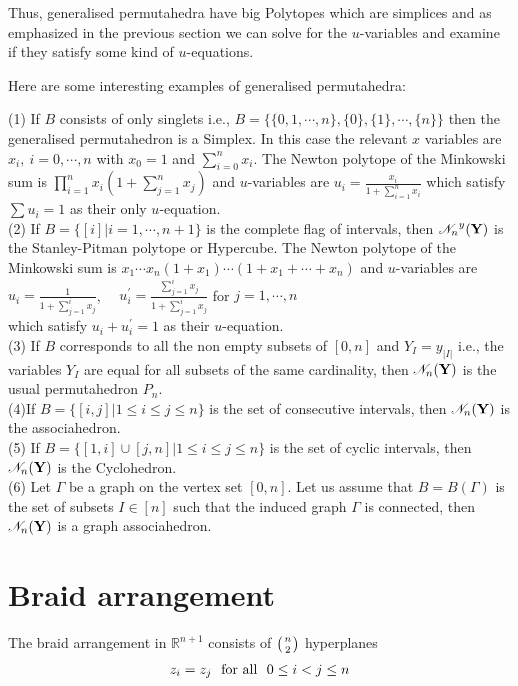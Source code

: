 \documentclass[hidelinks,12pt]{article}
\newcommand{\bea}[1]{\begin{eqnarray}\label{#1} }
\newcommand{\eea}{\end{eqnarray}}
\def\bea{\begin{eqnarray}}
\def\eea{\end{eqnarray}}
\begin{document}
Thus, generalised permutahedra have big Polytopes which are simplices and as emphasized in the previous section we can solve for the $u$-variables and examine if they satisfy some kind of $u$-equations.

Here are some interesting examples of generalised permutahedra:

(1) If $B$ consists of only singlets i.e., $B=\{ \{ 0,1,\cdots,n \}, \{ 0 \},\{ 1 \},\cdots ,\{ n \} \}$ then the generalised permutahedron is a Simplex. In this case the relevant $x$ variables are $x_i,~ i=0,\cdots,n$ with $x_0=1$ and $\sum_{i=0}^n x_i$. 
The Newton polytope of the Minkowski sum is $\prod_{i=1}^{n} x_i (1+\sum_{j=1}^{n} x_j)$ and $u$-variables are 
$u_i =\frac{ x_i}{1+\sum_{i=1}^n x_i} $
which satisfy $\sum u_i =1$ as their only $u$-equation. \\

(2) If $B= \{[i] | i=1,\cdots,n+1 \}$ is the complete flag of intervals, then ${\mathscr N_n}^y({\bf Y})$ is the Stanley-Pitman polytope or Hypercube.
The Newton polytope of the Minkowski sum is $x_1\cdots x_n (1+x_1) \cdots (1+x_1+\cdots +x_n)$ and $u$-variables are 
$u_i =\frac{ 1}{1+\sum_{j=1}^{i} x_j} $, ~~$u^{'}_i =\frac{ \sum_{j=1}^{i} x_j}{1+\sum_{j=1}^{i} x_j} $ for $j=1,\cdots,n$ \\
which satisfy $u_i +u^{'}_{i} =1$ as their $u$-equation. \\

(3) If $B$ corresponds to all the non empty subsets of $[0,n]$ and $Y_I =y_{|I|}$ i.e., the variables $Y_I$ are equal for all subsets of the same cardinality, then ${\mathscr N_n}({\bf Y})$ is the usual permutahedron $P_n$. \\

(4)If $B=\{ [i,j] | 1\leq  i \leq j \leq n\}$ is the set of consecutive intervals, then ${\mathscr N_n}({\bf Y})$ is the associahedron. \\

(5) If $B=\{ [1,i] \cup [j,n] | 1\leq  i \leq j \leq n\}$ is the set of cyclic intervals, then ${\mathscr N_n}({\bf Y})$ is the Cyclohedron.\\

(6) Let $\Gamma$ be a graph on the vertex set $[0,n]$. Let us assume that $B = B(\Gamma)$ is the set of subsets $I \in [n]$ such that the induced graph $\Gamma$ is connected, then  ${\mathscr N_n}({\bf Y})$ is a graph associahedron.\\

\section*{Braid arrangement}
The braid arrangement in $\mathbb{R}^{n+1}$ consists of $\left({n}\atop{2}\right)$ hyperplanes 
\bea
z_i =z_j ~~{\rm for ~ all}~~0 \leq i<j \leq n
\eea 
\end{document}
